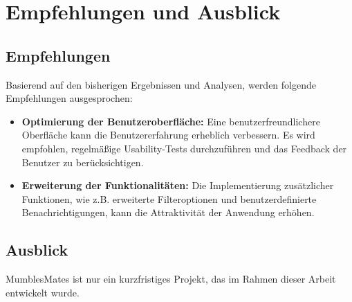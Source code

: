 \section{Empfehlungen und Ausblick}

\subsection{Empfehlungen}

Basierend auf den bisherigen Ergebnissen und Analysen, werden folgende Empfehlungen ausgesprochen:

\begin{itemize}
    \item \textbf{Optimierung der Benutzeroberfläche:} Eine benutzerfreundlichere Oberfläche kann die Benutzererfahrung erheblich verbessern. Es wird empfohlen, regelmäßige Usability-Tests durchzuführen und das Feedback der Benutzer zu berücksichtigen.
    \item \textbf{Erweiterung der Funktionalitäten:} Die Implementierung zusätzlicher Funktionen, wie z.B. erweiterte Filteroptionen und benutzerdefinierte Benachrichtigungen, kann die Attraktivität der Anwendung erhöhen.
\end{itemize}

\subsection{Ausblick}

MumblesMates ist nur ein kurzfristiges Projekt, das im Rahmen dieser Arbeit entwickelt wurde.

